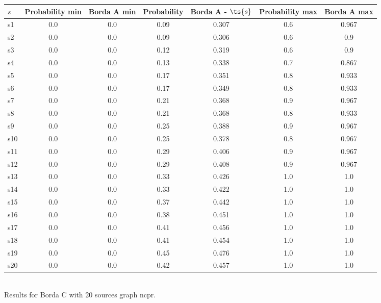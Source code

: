 \documentclass{article}
\begin{document}
\noindent\begin{tabular}{|l|c|c|c|c|c|c|}
\hline
$s$& Probability min & Borda A min & Probability & Borda A - $\ts{s}$ & Probability max & Borda A max\\
\hline
s1 &0.0 & 0.0 & 0.09 & 0.307 & 0.6 & 0.967\\
\hline
s2 &0.0 & 0.0 & 0.09 & 0.306 & 0.6 & 0.9\\
\hline
s3 &0.0 & 0.0 & 0.12 & 0.319 & 0.6 & 0.9\\
\hline
s4 &0.0 & 0.0 & 0.13 & 0.338 & 0.7 & 0.867\\
\hline
s5 &0.0 & 0.0 & 0.17 & 0.351 & 0.8 & 0.933\\
\hline
s6 &0.0 & 0.0 & 0.17 & 0.349 & 0.8 & 0.933\\
\hline
s7 &0.0 & 0.0 & 0.21 & 0.368 & 0.9 & 0.967\\
\hline
s8 &0.0 & 0.0 & 0.21 & 0.368 & 0.8 & 0.933\\
\hline
s9 &0.0 & 0.0 & 0.25 & 0.388 & 0.9 & 0.967\\
\hline
s10 &0.0 & 0.0 & 0.25 & 0.378 & 0.8 & 0.967\\
\hline
s11 &0.0 & 0.0 & 0.29 & 0.406 & 0.9 & 0.967\\
\hline
s12 &0.0 & 0.0 & 0.29 & 0.408 & 0.9 & 0.967\\
\hline
s13 &0.0 & 0.0 & 0.33 & 0.426 & 1.0 & 1.0\\
\hline
s14 &0.0 & 0.0 & 0.33 & 0.422 & 1.0 & 1.0\\
\hline
s15 &0.0 & 0.0 & 0.37 & 0.442 & 1.0 & 1.0\\
\hline
s16 &0.0 & 0.0 & 0.38 & 0.451 & 1.0 & 1.0\\
\hline
s17 &0.0 & 0.0 & 0.41 & 0.456 & 1.0 & 1.0\\
\hline
s18 &0.0 & 0.0 & 0.41 & 0.454 & 1.0 & 1.0\\
\hline
s19 &0.0 & 0.0 & 0.45 & 0.476 & 1.0 & 1.0\\
\hline
s20 &0.0 & 0.0 & 0.42 & 0.457 & 1.0 & 1.0\\
\hline
\end{tabular}\\

\noindent Results for Borda C with 20 sources graph ncpr.
\end{document}
